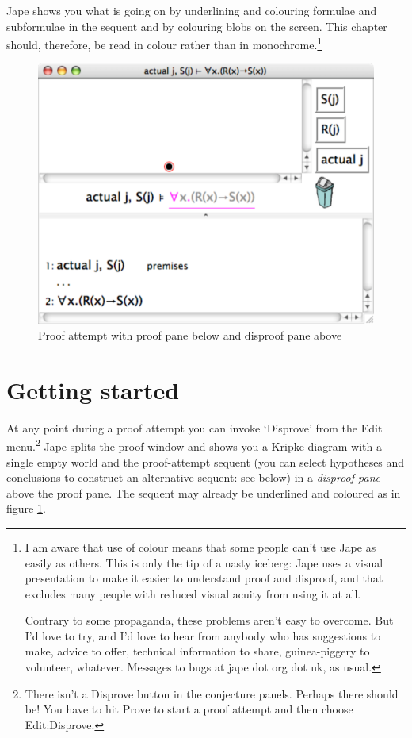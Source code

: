 \documentclass[11pt]{book}
\newcommand{\figref}[1]{figure \ref{fig:#1}}
\begin{document}
Jape shows you what is going on by underlining and colouring formulae and subformulae in the sequent and by colouring blobs on the screen. This chapter should, therefore, be read in colour rather than in monochrome.\footnote{I am aware that use of colour means that some people can't use Jape as easily as others. This is only the tip of a nasty iceberg: Jape uses a visual presentation to make it easier to understand proof and disproof, and that excludes many people with reduced visual acuity from using it at all.

Contrary to some propaganda, these problems aren't easy to overcome. But I'd love to try, and I'd love to hear from anybody who has suggestions to make, advice to offer, technical information to share, guinea-piggery to volunteer, whatever. Messages to bugs at jape dot org dot uk, as usual.}

\begin{figure}
\centering
\includegraphics[scale=0.5]{pics/disproofpane}
\caption{Proof attempt with proof pane below and disproof pane above}
\label{fig:disproofpane}
\end{figure}

\section{Getting started}

At any point during a proof attempt you can invoke `Disprove' from the Edit menu.\footnote{There isn't a Disprove button in the conjecture panels. Perhaps there should be! You have to hit Prove to start a proof attempt and then choose Edit:Disprove.} Jape splits the proof window and shows you a Kripke diagram with a single empty world and the proof-attempt sequent (you can select hypotheses and conclusions to construct an alternative sequent: see below) in a \emph{disproof pane} above the proof pane. The sequent may already be underlined and coloured as in \figref{disproofpane}.
\end{document}
